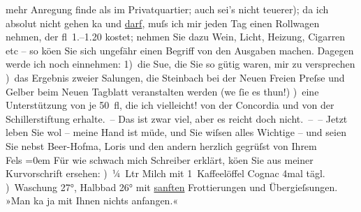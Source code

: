 \begin{ledgroupsized}[t]{13cm}
                    mehr Anregung finde als im Privatquartier; auch sei’s nicht teuerer); da ich
                    absolut nicht gehen ka{\geminationn} und \uline{darf}, muſs ich mir jeden Tag einen Rollwagen nehmen, der
                    fl 1.–1.20 kostet; nehmen Sie dazu Wein, Licht, Heizung, Cigarren etc – so kö{\geminationn}en Sie sich ungefähr einen Begriff von den
                    Ausgaben machen. Dagegen werde ich noch einnehmen: \pend
           \pstart
           {\pb}1) die Su{\geminationm}e,
                    die Sie so gütig waren, mir zu versprechen\pend
           ) das Ergebnis zweier Sa{\geminationm}lungen, die Steinbach bei der Neuen Freien Preſse und Gelber beim Neuen Tagblatt
                    veranstalten werden (we{\geminationn}{ }ſie es thun!)\pend
           ) eine Unterstützung von je 50 fl, die ich vielleicht! von der Concordia und von der Schillerstiftung erhalte. – Das ist zwar viel, aber es reicht doch
                    nicht. – –\pend
           \pstart
           Jetzt leben Sie wol – meine Hand ist müde, und Sie wiſsen alles Wichtige – und
                    seien Sie nebst Beer-Hofma{\geminationn}, Loris und den andern herzlich
                    gegrüſst von\pend
           \pstart
           Ihrem{\\[\baselineskip]}\spacefill\mbox{Fels}\pend
           \leftskip=0em{}\pstart
           \noindent{}Für wie schwach mich Schreiber erklärt,
                            kö{\geminationn}en Sie aus meiner Kurvorschrift
                        ersehen:\pend
           ) ¼ Ltr Milch mit 1 Kaffeelöffel Cognac 4mal tägl.\pend
           ) Waschung 27°, Halbbad 26° mit \uline{sanften}
                        Frottierungen und Übergieſsungen. »Man ka{\geminationn} ja
                        mit Ihnen nichts anfangen.«\pend
                     \endnumbering{}\end{ledgroupsized}  \newcommand{\dateiname}{L00176}\newcommand{\titel}{Friedrich M. Fels an Arthur Schnitzler, 1[6]. 2. 1893}\newcommand{\editorInnen}{Martin Anton Müller und Gerd-Hermann Susen}
            \footnotesize
\begin{ledgroupsized}[t]{11.5cm}
\end{ledgroupsized}
         
      